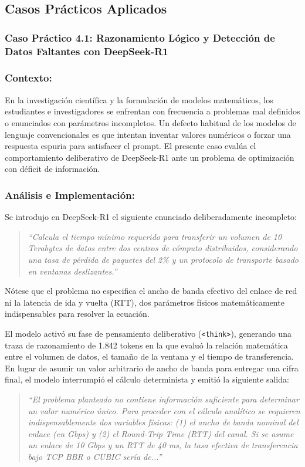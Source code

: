 \subsection{Casos Prácticos Aplicados}

\subsubsection{Caso Práctico 4.1: Razonamiento Lógico y Detección de Datos Faltantes con DeepSeek-R1}

\subsubsection*{Contexto:}
En la investigación científica y la formulación de modelos matemáticos, los estudiantes e investigadores se enfrentan con frecuencia a problemas mal definidos o enunciados con parámetros incompletos. Un defecto habitual de los modelos de lenguaje convencionales es que intentan inventar valores numéricos o forzar una respuesta espuria para satisfacer el prompt. El presente caso evalúa el comportamiento deliberativo de DeepSeek-R1 ante un problema de optimización con déficit de información.

\subsubsection*{Análisis e Implementación:}
Se introdujo en DeepSeek-R1 el siguiente enunciado deliberadamente incompleto:
\begin{quote}
\small\slshape ``Calcula el tiempo mínimo requerido para transferir un volumen de 10 Terabytes de datos entre dos centros de cómputo distribuidos, considerando una tasa de pérdida de paquetes del 2\% y un protocolo de transporte basado en ventanas deslizantes.''
\end{quote}
Nótese que el problema no especifica el ancho de banda efectivo del enlace de red ni la latencia de ida y vuelta (RTT), dos parámetros físicos matemáticamente indispensables para resolver la ecuación.

El modelo activó su fase de pensamiento deliberativo (\texttt{<think>}), generando una traza de razonamiento de 1.842 tokens en la que evaluó la relación matemática entre el volumen de datos, el tamaño de la ventana y el tiempo de transferencia. En lugar de asumir un valor arbitrario de ancho de banda para entregar una cifra final, el modelo interrumpió el cálculo determinista y emitió la siguiente salida:
\begin{quote}
\small\textit{``El problema planteado no contiene información suficiente para determinar un valor numérico único. Para proceder con el cálculo analítico se requieren indispensablemente dos variables físicas: (1) el ancho de banda nominal del enlace (en Gbps) y (2) el Round-Trip Time (RTT) del canal. Si se asume un enlace de 10 Gbps y un RTT de 40 ms, la tasa efectiva de transferencia bajo TCP BBR o CUBIC sería de...''}
\end{quote}

